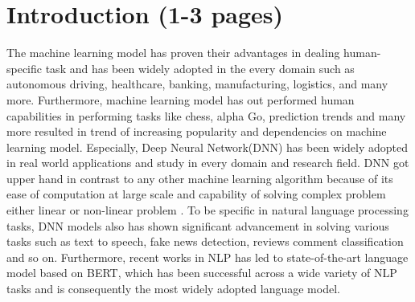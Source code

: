 \documentclass[%
	BCOR=8mm, %
	DIV=12, 
	toc=bibliography, %
	toc=listof, %
	oneside, %
	egregdoesnotlikesansseriftitles, %
	]{scrbook}
\begin{document}







\tableofcontents
\listoffigures
\listoftables

% 
\newpage


\pagestyle{headings}
\setcapindent{0pt}



\chapter{Introduction (1-3 pages)}
The machine learning model has proven their advantages in dealing human-specific task and has been widely adopted in the every domain such as autonomous driving, healthcare, banking, manufacturing, logistics, and many more. Furthermore, machine learning model has out performed human capabilities in performing tasks  like chess, alpha Go, prediction trends and many more resulted in trend of increasing popularity and dependencies on machine learning model. Especially, Deep Neural Network(DNN) has been widely adopted in real world applications and study in every domain and research field. DNN got upper hand in contrast to any other machine learning algorithm because of its ease of computation at large scale and capability of solving complex problem either linear or non-linear problem \cite{huq_adversarial_2020}. 
To be specific in natural language processing tasks, DNN  models also has shown significant advancement in solving various tasks such as text to speech, fake news detection, reviews comment classification and so on. Furthermore, recent works \cite{devlin_bert_2019,liu_roberta_2019,sanh_distilbert_2020,lan_albert_2020} in NLP has led to state-of-the-art language model based on BERT, which has been successful across a wide variety of NLP tasks and is consequently the most widely adopted language model. 
\end{document}
